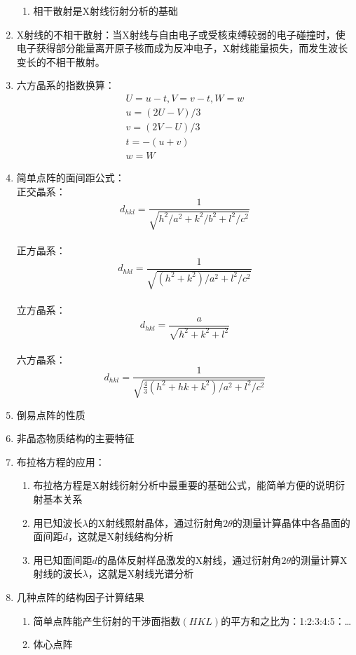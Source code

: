 \documentclass[12pt,a4paper]{article}
\begin{document}
\begin{enumerate}
\begin{enumerate}
            \item 相干散射是X射线衍射分析的基础
        \end{enumerate}
        \item X射线的不相干散射：当X射线与自由电子或受核束缚较弱的电子碰撞时，使电子获得部分能量离开原子核而成为反冲电子，X射线能量损失，而发生波长变长的不相干散射。
        \item 六方晶系的指数换算：$$\begin{array}{c}{U=u-t, V=v-t, W=w} \\ {u=(2 U-V) / 3} \\ {v=(2 V-U) / 3} \\ {t=-(u+v)} \\ {w=W}\end{array}$$
        \item 简单点阵的面间距公式：
        \\正交晶系：$$d_{h k l}=\frac{1}{\sqrt{h^{2} / a^{2}+k^{2} / b^{2}+l^{2} / c^{2}}}$$
        \\正方晶系：$$d_{h k l}=\frac{1}{\sqrt{\left(h^{2}+k^{2}\right) / a^{2}+l^{2} / c^{2}}}$$
        \\立方晶系：$$d_{h k l}=\frac{a}{\sqrt{h^{2}+k^{2}+l^{2}}}$$
        \\六方晶系：$$d_{h k l}=\frac{1}{\sqrt{\frac{4}{3}\left(h^{2}+h k+k^{2}\right) / a^{2}+l^{2} / c^{2}}}$$
        \item 倒易点阵的性质
        \item 非晶态物质结构的主要特征
        \item 布拉格方程的应用：
        \begin{enumerate}
            \item 布拉格方程是X射线衍射分析中最重要的基础公式，能简单方便的说明衍射基本关系
            \item 用已知波长$\lambda$的X射线照射晶体，通过衍射角$2\theta$的测量计算晶体中各晶面的面间距$d$，这就是X射线结构分析
            \item 用已知面间距$d$的晶体反射样品激发的X射线，通过衍射角$2\theta$的测量计算X射线的波长$\lambda$，这就是X射线光谱分析 
        \end{enumerate}
        \item 几种点阵的结构因子计算结果
        \begin{enumerate}
                \item 简单点阵能产生衍射的干涉面指数$(HKL)$的平方和之比为：1:2:3:4:5：\dots
                \item 体心点阵
                \begin{enumerate}

\end{enumerate}
\end{enumerate}
\end{enumerate}
\end{document}
